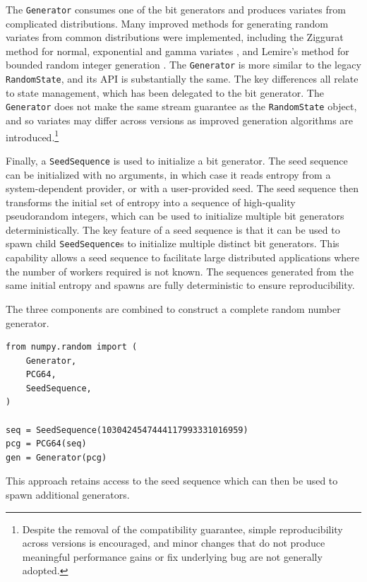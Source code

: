 The \texttt{Generator} consumes one of the bit generators and produces variates
from complicated distributions. Many improved methods for generating random
variates from common distributions were implemented, including the Ziggurat
method for normal, exponential and gamma variates \cite{ziggurat}, and Lemire's
method for bounded random integer generation \cite{lemire}. The \texttt{Generator}
is more similar to the legacy \texttt{RandomState}, and its API is substantially
the same. The key differences all relate to state management, which has been
delegated to the bit generator. The \texttt{Generator} does not make the same
stream guarantee as the \texttt{RandomState} object, and so variates may differ
across versions as improved generation algorithms are
introduced.\footnote{Despite the removal of the compatibility guarantee, simple
reproducibility across versions is encouraged, and minor changes that do not
produce meaningful performance gains or fix underlying bug are not generally
adopted.}

Finally, a \texttt{SeedSequence} is used to initialize a bit generator. The seed
sequence can be initialized with no arguments, in which case it reads entropy
from a system-dependent provider, or with a user-provided seed. The seed
sequence then transforms the initial set of entropy into a sequence of
high-quality pseudorandom integers, which can be used to initialize multiple bit
generators deterministically. The key feature of a seed sequence is that
it can be used to spawn child \texttt{SeedSequence}s to initialize
multiple distinct bit generators.
This capability allows a seed sequence to facilitate large distributed applications
where the number of workers required is not known. The sequences generated from
the same initial entropy and spawns are fully deterministic to ensure
reproducibility.

The three components are combined to construct a complete random number
generator.

\begin{lstlisting}
from numpy.random import (
    Generator,
    PCG64,
    SeedSequence,
)

seq = SeedSequence(1030424547444117993331016959)
pcg = PCG64(seq)
gen = Generator(pcg)
\end{lstlisting}

This approach retains access to the seed sequence which can then be
used to spawn additional generators.

